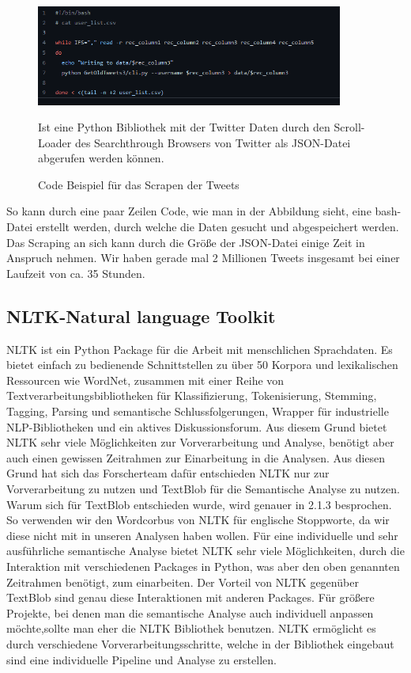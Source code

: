 	
	\begin{figure}[ht]
		\centering
		\includegraphics[width=0.9\textwidth]{images/Kapitel2/Code_Beispiel_1}
			\caption{\label{fig:CodeBeispiel}Code Beispiel für das Scrapen der Tweets}{Ist eine Python Bibliothek mit der Twitter Daten durch den Scroll-Loader 
			        des Searchthrough Browsers von Twitter als JSON-Datei abgerufen werden können.}
	\end{figure}
	
	So kann durch eine paar Zeilen Code, wie man in der Abbildung \label{CodeBeispiel} sieht, eine bash-Datei erstellt werden, durch welche die Daten gesucht 
	und abgespeichert werden. Das Scraping an sich kann durch die Größe der JSON-Datei einige Zeit in Anspruch nehmen. Wir haben gerade mal 2 Millionen Tweets 
	insgesamt bei einer Laufzeit von ca. 35 Stunden.  
	

	\subsection{NLTK-Natural language Toolkit}
	
	NLTK ist ein Python Package für die Arbeit mit menschlichen Sprachdaten. Es bietet einfach zu bedienende Schnittstellen zu über 50 Korpora
	und lexikalischen Ressourcen wie WordNet, zusammen mit einer Reihe von Textverarbeitungsbibliotheken für Klassifizierung, Tokenisierung, 
	Stemming, Tagging, Parsing und semantische Schlussfolgerungen, Wrapper für industrielle NLP-Bibliotheken und ein aktives Diskussionsforum. 
	Aus diesem Grund bietet NLTK sehr viele Möglichkeiten zur Vorverarbeitung und Analyse, benötigt aber auch einen gewissen Zeitrahmen zur 
	Einarbeitung in die Analysen. Aus diesen Grund hat sich das Forscherteam dafür entschieden NLTK nur zur Vorverarbeitung zu nutzen und TextBlob
	für die Semantische Analyse zu nutzen. Warum sich für TextBlob entschieden wurde, wird genauer in 2.1.3 besprochen. So verwenden wir den Wordcorbus
	von NLTK für englische Stoppworte, da wir diese nicht mit in unseren Analysen haben wollen. Für eine individuelle und sehr ausführliche semantische Analyse 
	bietet NLTK sehr viele Möglichkeiten, durch die Interaktion mit verschiedenen Packages in Python, was aber den oben genannten Zeitrahmen benötigt, zum 
	einarbeiten. Der Vorteil von NLTK gegenüber TextBlob sind genau diese Interaktionen mit anderen Packages. Für größere Projekte, bei denen man die 
	semantische Analyse auch individuell anpassen möchte,sollte man eher die NLTK Bibliothek benutzen. NLTK ermöglicht es durch verschiedene 
	Vorverarbeitungsschritte, welche in der Bibliothek eingebaut sind eine individuelle Pipeline und Analyse zu erstellen.
	
